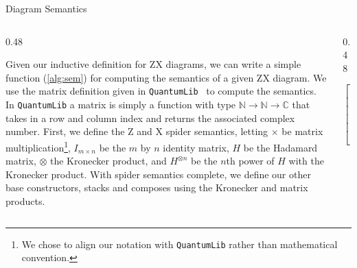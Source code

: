 \documentclass[final]{beamer}
\newlength{\colwidth}
\newcommand{\C}{\mathbb{C}}
\newcommand{\N}{\mathbb{N}}
\newcommand{\QLib}{\texttt{QuantumLib}\xspace}
\begin{document}
\begin{frame}[t]
\begin{columns}[t]
\begin{column}{\colwidth}
  \begin{block}{Diagram Semantics}

    \begin{columns}

      \begin{column}{0.48\colwidth}
        \justify
    
        Given our inductive definition for ZX diagrams, we can write a simple function (\ref{alg:sem}) for computing the semantics of a given ZX diagram.
        We use the matrix definition given in \QLib~\cite{QuantumLib} to compute the semantics.
        In \QLib a matrix is simply a function with type $\N \to \N \to \C$ that takes in a row and column index and returns the associated complex number.
        First, we define the Z and X spider semantics, letting $\times$ be matrix multiplication\footnote{We chose to align our notation with \QLib rather than mathematical convention.}, $I_{m\times n}$ be the $m$ by $n$ identity matrix, $H$ be the Hadamard matrix, $\otimes$ the Kronecker product, and $H^{\otimes n}$ be the $n$th power of $H$ with the Kronecker product.
        With spider semantics complete, we define our other base constructors, stacks and composes using the Kronecker and matrix products.

      \end{column}
      \begin{column}{0.48\colwidth}
        \begin{algorithm}[H]
          \caption{ZX Diagram Semantics}\label{alg:sem}
          \scriptsize
          \begin{algorithmic}
                \State \Return \(\begin{bmatrix}
                                    1 & 0 & \cdots & 0 & 0\\
                                    0 & 0 & \cdots & 0 & 0\\
                                    \vdots & & \ddots & & \vdots\\
                                    0 & 0 & \cdots & 0 & 0\\
                                    0 & 0 & \cdots & 0 & e^{i\alpha}\\
                                \end{bmatrix}\)
            \EndFunction


\end{algorithmic}
\end{algorithm}
\end{column}
\end{columns}
\end{block}
\end{column}
\end{columns}
\end{frame}
\end{document}
